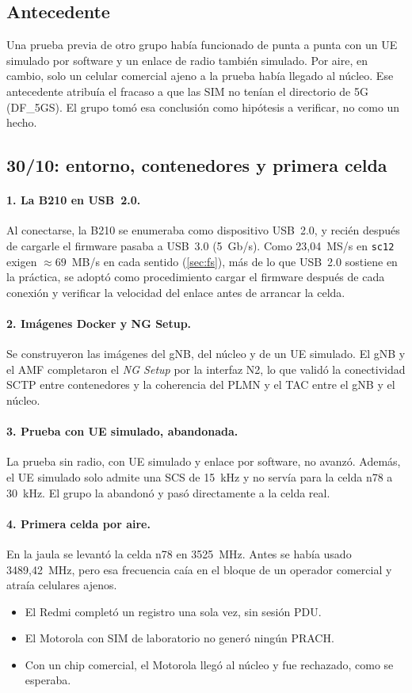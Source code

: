 \subsection*{Antecedente}
Una prueba previa de otro grupo había funcionado de punta a punta con un UE simulado por software y un enlace de radio también simulado. Por aire, en cambio, solo un celular comercial ajeno a la prueba había llegado al núcleo. Ese antecedente atribuía el fracaso a que las SIM no tenían el directorio de 5G (DF\_5GS). El grupo tomó esa conclusión como hipótesis a verificar, no como un hecho.

\subsection{30/10: entorno, contenedores y primera celda}
\paragraph{1. La B210 en USB~2.0.} Al conectarse, la B210 se enumeraba como dispositivo USB~2.0, y recién después de cargarle el firmware pasaba a USB~3.0 (5~Gb/s). Como 23,04~MS/s en \texttt{sc12} exigen $\approx 69$~MB/s en cada sentido (\cref{sec:fs}), más de lo que USB~2.0 sostiene en la práctica, se adoptó como procedimiento cargar el firmware después de cada conexión y verificar la velocidad del enlace antes de arrancar la celda.

\paragraph{2. Imágenes Docker y NG Setup.} Se construyeron las imágenes del gNB, del núcleo y de un UE simulado. El gNB y el AMF completaron el \emph{NG Setup} por la interfaz N2, lo que validó la conectividad SCTP entre contenedores y la coherencia del PLMN y el TAC entre el gNB y el núcleo.

\paragraph{3. Prueba con UE simulado, abandonada.} La prueba sin radio, con UE simulado y enlace por software, no avanzó. Además, el UE simulado solo admite una SCS de 15~kHz y no servía para la celda n78 a 30~kHz. El grupo la abandonó y pasó directamente a la celda real.

\paragraph{4. Primera celda por aire.} En la jaula se levantó la celda n78 en 3525~MHz. Antes se había usado 3489,42~MHz, pero esa frecuencia caía en el bloque de un operador comercial y atraía celulares ajenos.
\begin{itemize}
  \item El Redmi completó un registro una sola vez, sin sesión PDU.
  \item El Motorola con SIM de laboratorio no generó ningún PRACH.
  \item Con un chip comercial, el Motorola llegó al núcleo y fue rechazado, como se esperaba.
\end{itemize}

